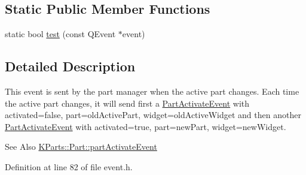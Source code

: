 \subsection*{Static Public Member Functions}
\begin{DoxyCompactItemize}
\item 
static bool \hyperlink{classKParts_1_1PartActivateEvent_ab2b795f3ff5ed09524e0357ee21cf264}{test} (const Q\+Event $\ast$event)
\end{DoxyCompactItemize}


\subsection{Detailed Description}
This event is sent by the part manager when the active part changes. Each time the active part changes, it will send first a \hyperlink{classKParts_1_1PartActivateEvent}{Part\+Activate\+Event} with activated=false, part=old\+Active\+Part, widget=old\+Active\+Widget and then another \hyperlink{classKParts_1_1PartActivateEvent}{Part\+Activate\+Event} with activated=true, part=new\+Part, widget=new\+Widget. \begin{DoxySeeAlso}{See Also}
\hyperlink{classKParts_1_1Part_ad848641dbb38a3b2404b2ad554a08fba}{K\+Parts\+::\+Part\+::part\+Activate\+Event} 
\end{DoxySeeAlso}


Definition at line 82 of file event.\+h.



